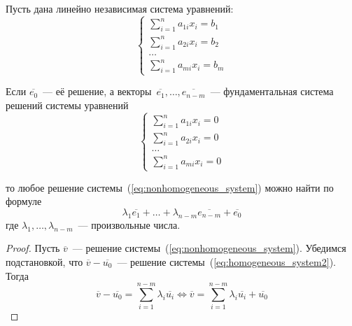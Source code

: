 \begin{theorem}
Пусть дана линейно независимая система уравнений:
\begin{equation}
\label{eq:nonhomogeneous_system}
\begin{cases}
\displaystyle \sum_{i=1}^n a_{1i} x_i = b_1 \\
\displaystyle \sum_{i=1}^n a_{2i} x_i = b_2 \\
\ldots \\
\displaystyle \sum_{i=1}^n a_{mi} x_i = b_m
\end{cases}
\end{equation}

Если $\overline{e_0}$~--- её решение, а векторы~$\overline{e_1}, \ldots, \overline{e_{n-m}}$~--- фундаментальная система решений системы уравнений
\begin{equation}
\label{eq:homogeneous_system2}
\begin{cases}
\displaystyle \sum_{i=1}^n a_{1i} x_i = 0 \\
\displaystyle \sum_{i=1}^n a_{2i} x_i = 0 \\
\ldots \\
\displaystyle \sum_{i=1}^n a_{mi} x_i = 0
\end{cases}
\end{equation}

то любое решение системы~(\ref*{eq:nonhomogeneous_system}) можно найти по формуле
\begin{equation*}
\lambda_1 \overline{e_1} + \ldots + \lambda_{n-m} \overline{e_{n-m}} + \overline{e_0}
\end{equation*}
где $\lambda_1, \ldots, \lambda_{n-m}$~--- произвольные числа.
\end{theorem}
\begin{proof}
Пусть $\overline v$~--- решение системы~(\ref*{eq:nonhomogeneous_system}).
Убедимся подстановкой, что $\overline v - \overline{u_0}$~--- решение системы~(\ref*{eq:homogeneous_system2}).
Тогда
\begin{equation*}
\overline v - \overline{u_0} = \sum_{i=1}^{n-m} \lambda_i \overline{u_i} \Leftrightarrow
\overline v = \sum_{i=1}^{n-m} \lambda_i \overline{u_i} + \overline{u_0}
\end{equation*}
\end{proof}